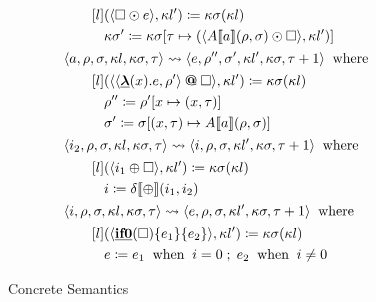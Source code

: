 \begin{figure}
\begin{align*}
&\hspace{2em}  \begin{aligned}[l]  & ( \langle  \square   \odot  e \rangle , \kappa l')  \coloneqq   \kappa  \sigma ( \kappa l)  \\  &  \kappa  \sigma '  \coloneqq   \kappa  \sigma  \lbrack  \tau   \mapsto  ( \langle A \llbracket a \rrbracket ( \rho , \sigma )  \odot   \square  \rangle , \kappa l') \rbrack   \end{aligned}  \\
&\hspace{0em}  \langle a, \rho , \sigma , \kappa l, \kappa  \sigma , \tau  \rangle   \rightsquigarrow   \langle e, \rho '', \sigma ', \kappa l', \kappa  \sigma , \tau +1 \rangle   \;\;\text{where}\;\;   \\
&\hspace{2em}  \begin{aligned}[l]  & ( \langle  \langle  \keyword{\lambda} (x).e, \rho ' \rangle   \keywordop{ \mathbin{\bm{@}} }   \square  \rangle , \kappa l')  \coloneqq   \kappa  \sigma ( \kappa l)  \\  &  \rho ''  \coloneqq   \rho ' \lbrack x  \mapsto  (x, \tau ) \rbrack   \\  &  \sigma '  \coloneqq   \sigma  \lbrack (x, \tau )  \mapsto  A \llbracket a \rrbracket ( \rho , \sigma ) \rbrack   \end{aligned}  \\
&\hspace{0em}  \langle i _2 , \rho , \sigma , \kappa l, \kappa  \sigma , \tau  \rangle   \rightsquigarrow   \langle i, \rho , \sigma , \kappa l', \kappa  \sigma , \tau +1 \rangle   \;\;\text{where}\;\;   \\
&\hspace{2em}  \begin{aligned}[l]  & ( \langle i _1   \oplus   \square  \rangle , \kappa l')  \coloneqq   \kappa  \sigma ( \kappa l)  \\  & i  \coloneqq   \delta  \llbracket  \oplus  \rrbracket (i _1 ,i _2 )  \end{aligned}  \\
&\hspace{0em}  \langle i, \rho , \sigma , \kappa l, \kappa  \sigma , \tau  \rangle   \rightsquigarrow   \langle e, \rho , \sigma , \kappa l', \kappa  \sigma , \tau +1 \rangle   \;\;\text{where}\;\;   \\
&\hspace{2em}  \begin{aligned}[l]  & ( \langle  \keyword{if0} ( \square ) \{ e _1  \}  \{ e _2  \}  \rangle , \kappa l')  \coloneqq   \kappa  \sigma ( \kappa l)  \\  & e  \coloneqq  e _1   \;\;\text{when}\;\;  i = 0  \;;\;  e _2   \;\;\text{when}\;\;  i  \neq  0  \end{aligned} 
\end{align*}\normalsize

\caption{Concrete Semantics}
\label{ConcreteSemantics}

\end{figure}

